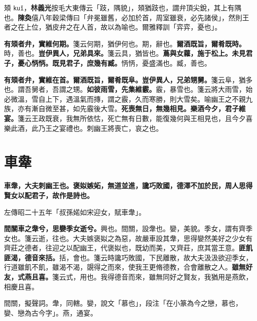 \begin{quoting}頍 \texttt{kuǐ}，\textbf{林義光}按毛大東傳云「跂，隅貌」，頍猶跂也，謂弁頂尖銳，其上有隅也。\textbf{陳奐}僖八年穀梁傳曰「弁冕雖舊，必加於首，周室雖衰，必先諸侯」，然則王者之在上位，猶皮弁之在人首，故以為喻也。爾雅釋訓「弈弈，憂也」。\end{quoting}

\textbf{有頍者弁，實維何期。}{\footnotesize 箋云何期，猶伊何也。期，辭也。}\textbf{爾酒既旨，爾肴既時。}{\footnotesize 時，善也。}\textbf{豈伊異人，兄弟具來。}{\footnotesize 箋云具，猶皆也。}\textbf{蔦與女蘿，施于松上。未見君子，憂心怲怲。既見君子，庶幾有臧。}{\footnotesize 怲怲，憂盛滿也。臧，善也。}

\textbf{有頍者弁，實維在首。爾酒既旨，爾肴既阜。豈伊異人，兄弟甥舅。}{\footnotesize 箋云阜，猶多也。謂吾舅者，吾謂之甥。}\textbf{如彼雨雪，先集維霰。}{\footnotesize 霰，暴雪也。箋云將大雨雪，始必微溫，雪自上下，遇溫氣而摶，謂之霰，久而寒勝，則大雪矣。喻幽王之不親九族，亦有漸自微至甚，如先霰後大雪。}\textbf{死喪無日，無幾相見。樂酒今夕，君子維宴。}{\footnotesize 箋云王政既衰，我無所依怙，死亡無有日數，能復幾何與王相見也，且今夕喜樂此酒，此乃王之宴禮也。刺幽王將喪亡，哀之也。}

\section{車舝}


\textbf{車舝，大夫刺幽王也。褒姒嫉妬，無道並進，讒巧敗國，德澤不加於民，周人思得賢女以配君子，故作是詩也。}

\begin{quoting}左傳昭二十五年「叔孫婼如宋迎女，賦車舝」。\end{quoting}

\textbf{間關車之舝兮，思孌季女逝兮。}{\footnotesize 興也。間關，設舝也。孌，美貌。季女，謂有齊季女也。箋云逝，往也。大夫嫉褒姒之為惡，故嚴車設其舝，思得孌然美好之少女有齊莊之德者，往迎之以配幽王，代褒姒也，既幼而美，又齊莊，庶其當王意。}\textbf{匪飢匪渴，德音來括。}{\footnotesize 括，會也。箋云時讒巧敗國，下民離散，故大夫汲汲欲迎季女，行道雖飢不飢，雖渴不渴，覬得之而來，使我王更脩德教，合會離散之人。}\textbf{雖無好友，式燕且喜。}{\footnotesize 箋云式，用也。我得德音而來，雖無同好之賢友，我猶用是燕飲，相慶且喜。}

\begin{quoting}間關，擬聲詞。舝，同轄。孌，說文「慕也」，段注「在小篆為今之戀，慕也，孌、戀為古今字」。燕，通宴。\end{quoting}

